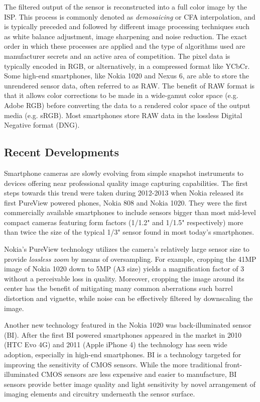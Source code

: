 \documentclass[thesis.tex]{subfiles}
\begin{document}
The filtered output of the sensor is reconstructed into a full color image by the ISP. This process is commonly denoted as \textit{demosaicing} or CFA interpolation, and is typically preceded and followed by different image processing techniques such as white balance adjustment, image sharpening and noise reduction. The exact order in which these processes are applied and the type of algorithms used are manufacturer secrets and an active area of competition. The pixel data is typically encoded in RGB, or alternatively, in a compressed format like YCbCr. Some high-end smartphones, like Nokia 1020 and Nexus 6, are able to store the unrendered sensor data, often referred to as RAW. The benefit of RAW format is that it allows color corrections to be made in a wide-gamut color space (e.g. Adobe RGB) before converting the data to a rendered color space of the output media (e.g. sRGB). Most smartphones store RAW data in the lossless Digital Negative format (DNG).

\subsection{Recent Developments}\label{chapter:solutions}

Smartphone cameras are slowly evolving from simple snapshot instruments to devices offering near professional quality image capturing capabilities. The first steps towards this trend were taken during 2012-2013 when Nokia released its first PureView powered phones, Nokia 808 and Nokia 1020. They were the first commercially available smartphones to include sensors bigger than most mid-level compact cameras featuring form factors (1/1.2" and 1/1.5" respectively) more than twice the size of the typical 1/3" sensor found in most today's smartphones.

Nokia's PureView technology utilizes the camera's relatively large sensor size to provide \textit{lossless zoom} by means of oversampling. For example, cropping the 41MP image of Nokia 1020 down to 5MP (A3 size) yields a magnification factor of 3 without a perceivable loss in quality. Moreover, cropping the image around its center has the benefit of mitigating many common aberrations such barrel distortion and vignette, while noise can be effectively filtered by downscaling the image. \cite{lumia_1020}

Another new technology featured in the Nokia 1020 was back-illuminated sensor (BI). After the first BI powered smartphones appeared in the market in 2010 (HTC Evo 4G) and 2011 (Apple iPhone 4) the technology has seen wide adoption, especially in high-end smartphones. BI is a technology targeted for improving the sensitivity of CMOS sensors. While the more traditional front-illuminated CMOS sensors are less expensive and easier to manufacture, BI sensors provide better image quality and light sensitivity by novel arrangement of imaging elements and circuitry underneath the sensor surface.
\end{document}
